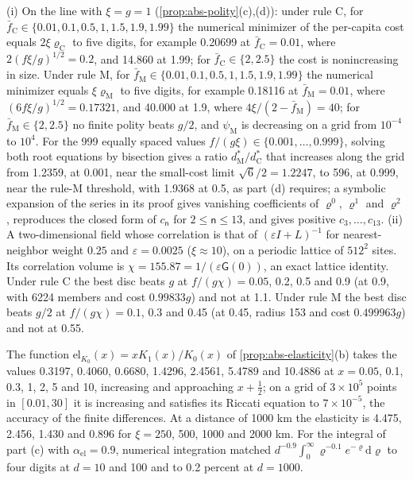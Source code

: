 \begin{numcheck}\label{chk:abs-polity}
(i) On the line with $\xi=g=1$ (\cref{prop:abs-polity}(c),(d)): under rule C, for $\bar f_{\mathrm C}\in\{0.01,0.1,0.5,1,1.5,1.9,1.99\}$ the numerical minimizer of the per-capita cost equals $2\xi\varrho_{\mathrm C}$ to five digits, for example 0.20699 at $\bar f_{\mathrm C}=0.01$, where $2(f\xi/g)^{1/2}=0.2$, and 14.860 at 1.99; for $\bar f_{\mathrm C}\in\{2,2.5\}$ the cost is nonincreasing in size. Under rule M, for $\bar f_{\mathrm M}\in\{0.01,0.1,0.5,1,1.5,1.9,1.99\}$ the numerical minimizer equals $\xi\varrho_{\mathrm M}$ to five digits, for example 0.18116 at $\bar f_{\mathrm M}=0.01$, where $(6f\xi/g)^{1/2}=0.17321$, and 40.000 at 1.9, where $4\xi/(2-\bar f_{\mathrm M})=40$; for $\bar f_{\mathrm M}\in\{2,2.5\}$ no finite polity beats $g/2$, and $\psi_{\mathrm M}$ is decreasing on a grid from $10^{-4}$ to $10^4$. For the 999 equally spaced values $f/(g\xi)\in\{0.001,\dots,0.999\}$, solving both root equations by bisection gives a ratio $d^\ast_{\mathrm M}/d^\ast_{\mathrm C}$ that increases along the grid from 1.2359, at 0.001, near the small-cost limit $\sqrt6/2=1.2247$, to 596, at 0.999, near the rule-M threshold, with 1.9368 at 0.5, as part (d) requires; a symbolic expansion of the series in its proof gives vanishing coefficients of $\varrho^0$, $\varrho^1$ and $\varrho^2$, reproduces the closed form of $c_{\mathsf n}$ for $2\le\mathsf n\le13$, and gives positive $c_3,\dots,c_{13}$. (ii) A two-dimensional field whose correlation is that of $(\varepsilon I+L)^{-1}$ for nearest-neighbor weight $0.25$ and $\varepsilon=0.0025$ ($\xi\approx10$), on a periodic lattice of $512^2$ sites. Its correlation volume is $\chi=155.87=1/(\varepsilon\mathsf G(0))$, an exact lattice identity. Under rule C the best disc beats $g$ at $f/(g\chi)=0.05$, 0.2, 0.5 and 0.9 (at 0.9, with 6224 members and cost $0.99833g$) and not at 1.1. Under rule M the best disc beats $g/2$ at $f/(g\chi)=0.1$, 0.3 and 0.45 (at 0.45, radius 153 and cost $0.499963g$) and not at 0.55.
\end{numcheck}

\begin{numcheck}\label{chk:abs-elasticity}
The function $\mathrm{el}_{K_0}(x)=xK_1(x)/K_0(x)$ of \cref{prop:abs-elasticity}(b) takes the values 0.3197, 0.4060, 0.6680, 1.4296, 2.4561, 5.4789 and 10.4886 at $x=0.05$, 0.1, 0.3, 1, 2, 5 and 10, increasing and approaching $x+\frac12$; on a grid of $3\times10^5$ points in $[0.01,30]$ it is increasing and satisfies its Riccati equation to $7\times10^{-5}$, the accuracy of the finite differences. At a distance of 1000 km the elasticity is 4.475, 2.456, 1.430 and 0.896 for $\xi=250$, 500, 1000 and 2000 km. For the integral of part (c) with $\alpha_{\mathrm{el}}=0.9$, numerical integration matched $d^{-0.9}\int_0^\infty\varrho^{-0.1}e^{-\varrho}\mathrm d\varrho$ to four digits at $d=10$ and 100 and to 0.2 percent at $d=1000$.
\end{numcheck}

